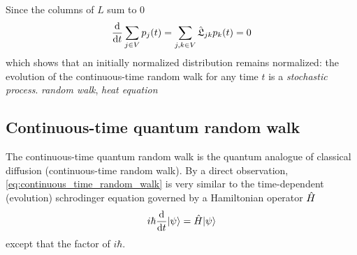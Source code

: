 Since the columns of $L$ sum to 0
\begin{equation}
	\dv{t} \sum_{j\in V} p_j (t) = 
	\sum_{j,k\in V} \hat{\mathfrak{L}}_{jk}  p_k(t) = 0
\end{equation}
which shows that an initially normalized distribution remains normalized:
the evolution of the continuous-time random walk for any time $t$ is a \emph{stochastic process}.
\emph{random walk}, \emph{heat equation}

\subsection{Continuous-time quantum random walk}\label{sec:ct_quantum_walk}
The continuous-time quantum random walk \cite{childsExampleDifferenceQuantum2002} is the quantum analogue of classical diffusion (continuous-time random walk).
By a direct observation, \cref{eq:continuous_time_random_walk} is very similar to the time-dependent (evolution) schrodinger equation governed by a Hamiltonian operator $\hat{H}$
\begin{equation}
	i\hbar \dv{t} | \psi \rangle = \hat{H} | \psi \rangle
\end{equation}
except that the factor of $i\hbar$.
\begin{definition}
	
\end{definition}

